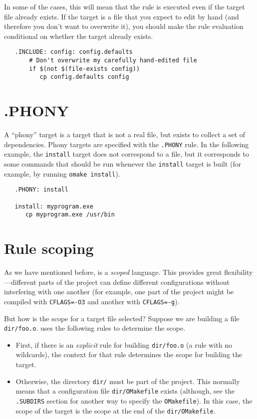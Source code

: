 In some of the cases, this will mean that the rule is executed even if the target file already
exists.  If the target is a file that you expect to edit by hand (and therefore you don't want to
overwrite it), you should make the rule evaluation conditional on whether the target already exists.

\begin{verbatim}
   .INCLUDE: config: config.defaults
       # Don't overwrite my carefully hand-edited file
       if $(not $(file-exists config))
          cp config.defaults config
\end{verbatim}

\section{.PHONY}

A ``phony'' target is a target that is not a real file, but exists to collect a set of dependencies.
Phony targets are specified with the \verb+.PHONY+ rule.  In the following example, the
\verb+install+ target does not correspond to a file, but it corresponds to some commands that should
be run whenever the \verb+install+ target is built (for example, by running \verb+omake install+).

\begin{verbatim}
   .PHONY: install

   install: myprogram.exe
      cp myprogram.exe /usr/bin
\end{verbatim}

\section{Rule scoping}

As we have mentioned before,  is a \emph{scoped} language.  This provides great
flexibility---different parts of the project can define different configurations without interfering
with one another (for example, one part of the project might be compiled with \verb+CFLAGS=-O3+ and
another with \verb+CFLAGS=-g+).

But how is the scope for a target file selected?  Suppose we are building a file \verb+dir/foo.o+.
 uses the following rules to determine the scope.

\begin{itemize}
\item First, if there is an \emph{explicit} rule for building \verb+dir/foo.o+ (a rule with no
wildcards), the context for that rule determines the scope for building the target.
\item Otherwise, the directory \verb+dir/+ must be part of the project.  This normally means that a
configuration file \verb+dir/OMakefile+ exists (although, see the \verb+.SUBDIRS+ section for
another way to specify the \verb+OMakefile+).  In this case, the scope of the target is the scope at
the end of the \verb+dir/OMakefile+.
\end{itemize}


